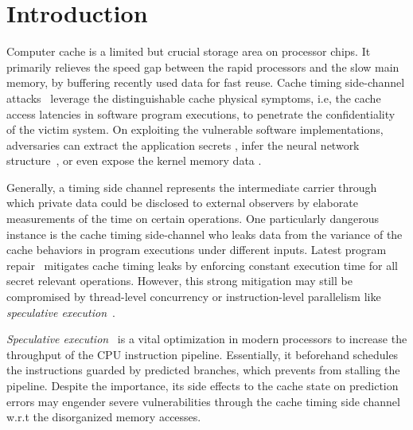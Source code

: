\documentclass[sigconf, review]{acmart}
\begin{document}
\section{Introduction}
\label{sec:intro}
Computer cache is a limited but crucial storage area on processor chips. 
It primarily relieves the speed gap between the rapid processors and the 
slow main memory, by buffering recently used data for fast reuse. Cache 
timing side-channel attacks~\cite{Kocher96,DhemKLMQW98} leverage the 
distinguishable cache physical symptoms, i.e, the cache access latencies 
in software program executions, to penetrate the confidentiality of the 
victim system. On exploiting the vulnerable software implementations, 
adversaries can extract the application secrets
\cite{OsvikST06,TromerOS10,GullaschBK11,CGM16}, infer the neural network 
structure~\cite{YanFT18,HuLDLXJDLSX18,HongDKLRKDD18,DudduSRB18}, or even 
expose the kernel memory data
\cite{HundWH13,LippSGPHFHMKGYH18,KocherGGHHLMPSY19,WeisseVMGKPSSWY18}.


Generally, a timing side channel represents the intermediate carrier through 
which private data could be disclosed to external observers by elaborate 
measurements of the time on certain operations. One particularly dangerous 
instance is the cache timing side-channel who leaks data from the variance 
of the cache behaviors in program executions under different inputs. Latest 
program repair~\cite{WuGSW18} mitigates cache timing leaks by enforcing 
constant execution time for all secret relevant operations. However, this 
strong mitigation may still be compromised by thread-level concurrency
\cite{GuoWW18} or instruction-level parallelism like \textit{speculative 
execution}~\cite{kimuraKT1996}.


\textit{Speculative execution}~\cite{kimuraKT1996} is a vital optimization 
in modern processors to increase the throughput of the CPU instruction 
pipeline. Essentially, it beforehand schedules the instructions guarded by 
predicted branches, which prevents from stalling the pipeline. Despite the 
importance, its side effects to the cache state on prediction errors may 
engender severe vulnerabilities through the cache timing side channel
\cite{KocherGGHHLMPSY19,BulckMWGKPSWYS18,WeisseVMGKPSSWY18,IslamMBKGES19} 
w.r.t the disorganized memory accesses.
\end{document}
